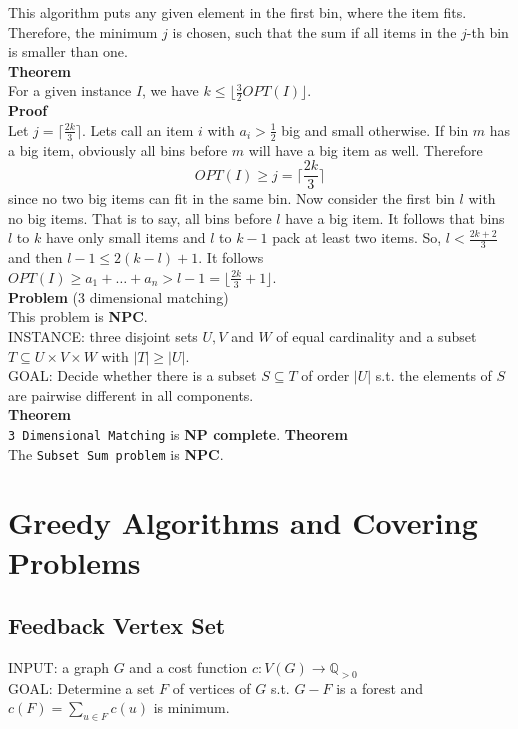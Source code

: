 \documentclass[a4paper, 12pt]{article}
\begin{document}
	This algorithm puts any given element in the first bin, where the item fits. Therefore, the minimum $j$ is chosen, such that the sum if all items in the $j$-th bin is smaller than one.\\
	\textbf{Theorem}\\
	For a given instance $I$, we have $k \leq \lfloor \frac{3}{2} OPT(I) \rfloor$.\\
	\textbf{Proof}\\
	Let $j = \lceil \frac{2k}{3} \rceil$. Lets call an item $i$ with $a_i > \frac{1}{2}$ big and small otherwise. If bin $m$ has a big item, obviously all bins before $m$ will have a big item as well. Therefore \[OPT(I) \geq j = \lceil \frac{2k}{3} \rceil\] since no two big items can fit in the same bin. Now consider the first bin $l$ with no big items. That is to say, all bins before $l$ have a big item. It follows that bins $l$ to $k$ have only small items and $l$ to $k-1$ pack at least two items. So, $l < \frac{2k+2}{3}$ and then $l-1 \leq 2(k-l)+1$. It follows $OPT(I) \geq a_1 + \dots + a_n > l-1 = \lfloor \frac{2k}{3} + 1\rfloor$.\\
	
	\noindent\textbf{Problem} (3 dimensional matching)\\
	This problem is \textbf{NPC}.\\
	INSTANCE: three disjoint sets $U, V$ and $W$ of equal cardinality and a subset $T \subseteq U\times V \times W$ with $\left|T\right| \geq \left|U\right|$.\\
	GOAL: Decide whether there is a subset $S\subseteq T$ of order $\left|U\right|$ s.t. the elements of $S$ are pairwise different in all components.\\
	\textbf{Theorem}\\
	\texttt{3 Dimensional Matching} is \textbf{NP complete}.
	\textbf{Theorem}\\
	The \texttt{Subset Sum problem} is \textbf{NPC}.

	\section{Greedy Algorithms and Covering Problems}
	\subsection{Feedback Vertex Set}
	INPUT: a graph $G$ and a cost function $c: V(G) \to \mathbb{Q}_{>0}$\\
	GOAL: Determine a set $F$ of vertices of $G$ s.t. $G-F$ is a forest and $c(F) = \sum_{u \in F} c(u)$ is minimum.\\
	
\end{document}
